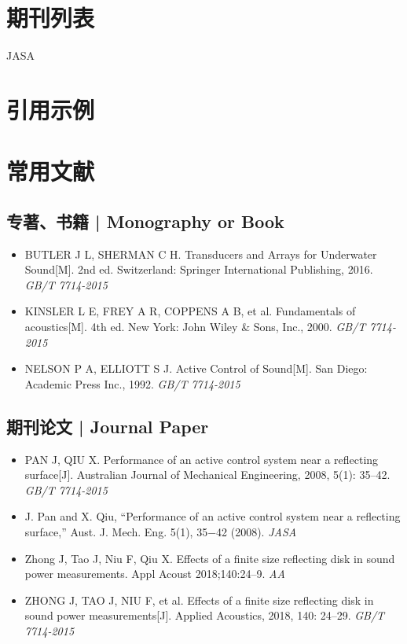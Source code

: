 \documentclass{ctexbook}
\begin{document}
\chapter{期刊列表}
JASA

\chapter{引用示例}

\chapter{常用文献}
\section{专著、书籍 | Monography or Book}
\begin{itemize}
	\item BUTLER J L, SHERMAN C H. Transducers and Arrays for Underwater Sound[M]. 2nd ed. Switzerland: Springer International Publishing, 2016. \emph{GB/T 7714-2015}
	\item KINSLER L E, FREY A R, COPPENS A B, et al. Fundamentals of acoustics[M]. 4th ed. New York: John Wiley \& Sons, Inc., 2000. \emph{GB/T 7714-2015}
	\item NELSON P A, ELLIOTT S J. Active Control of Sound[M]. San Diego: Academic Press Inc., 1992. \emph{GB/T 7714-2015}
\end{itemize}

\section{期刊论文 | Journal Paper}

\begin{itemize}
	\item PAN J, QIU X. Performance of an active control system near a reflecting surface[J]. Australian Journal of Mechanical Engineering, 2008, 5(1): 35--42. \emph{GB/T 7714-2015}
	\item J. Pan and X. Qiu, “Performance of an active control system near a reflecting surface,” Aust. J. Mech. Eng. 5(1), 35−42 (2008). \emph{JASA}
	\item Zhong J, Tao J, Niu F, Qiu X. Effects of a finite size reflecting disk in sound power measurements. Appl Acoust 2018;140:24–9. \emph{AA}
	\item ZHONG J, TAO J, NIU F, et al. Effects of a finite size reflecting disk in sound power measurements[J]. Applied Acoustics, 2018, 140: 24--29. \emph{GB/T 7714-2015}
\end{itemize}
\end{document}
